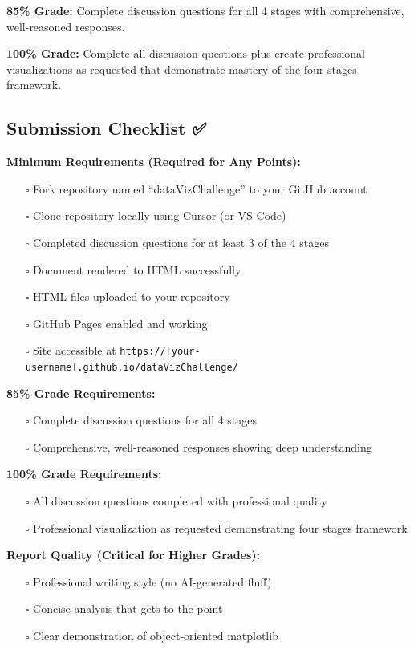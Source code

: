 \documentclass[
  letterpaper,
  DIV=11,
  numbers=noendperiod]{scrartcl}
\providecommand{\tightlist}{%
  \setlength{\itemsep}{0pt}\setlength{\parskip}{0pt}}
\begin{document}
\textbf{85\% Grade:} Complete discussion questions for all 4 stages with
comprehensive, well-reasoned responses.

\textbf{100\% Grade:} Complete all discussion questions plus create
professional visualizations as requested that demonstrate mastery of the
four stages framework.

\subsection{Submission Checklist ✅}\label{submission-checklist}

\textbf{Minimum Requirements (Required for Any Points):}

\begin{itemize}
\tightlist
\item[$\square$]
  Fork repository named ``dataVizChallenge'' to your GitHub account
\item[$\square$]
  Clone repository locally using Cursor (or VS Code)
\item[$\square$]
  Completed discussion questions for at least 3 of the 4 stages
\item[$\square$]
  Document rendered to HTML successfully
\item[$\square$]
  HTML files uploaded to your repository
\item[$\square$]
  GitHub Pages enabled and working
\item[$\square$]
  Site accessible at
  \texttt{https://{[}your-username{]}.github.io/dataVizChallenge/}
\end{itemize}

\textbf{85\% Grade Requirements:}

\begin{itemize}
\tightlist
\item[$\square$]
  Complete discussion questions for all 4 stages
\item[$\square$]
  Comprehensive, well-reasoned responses showing deep understanding
\end{itemize}

\textbf{100\% Grade Requirements:}

\begin{itemize}
\tightlist
\item[$\square$]
  All discussion questions completed with professional quality
\item[$\square$]
  Professional visualization as requested demonstrating four stages
  framework
\end{itemize}

\textbf{Report Quality (Critical for Higher Grades):}

\begin{itemize}
\tightlist
\item[$\square$]
  Professional writing style (no AI-generated fluff)
\item[$\square$]
  Concise analysis that gets to the point
\item[$\square$]
  Clear demonstration of object-oriented matplotlib
\end{itemize}
\end{document}

